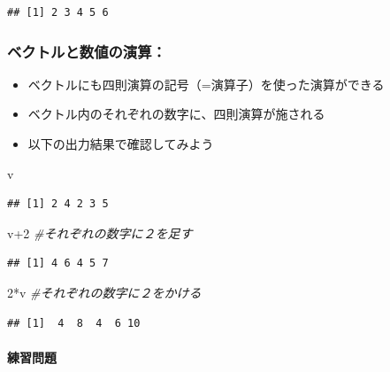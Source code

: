 \documentclass[
]{book}
\newenvironment{Shaded}{\begin{snugshade}}{\end{snugshade}}
\newcommand{\CommentTok}[1]{\textcolor[rgb]{0.56,0.35,0.01}{\textit{#1}}}
\newcommand{\DecValTok}[1]{\textcolor[rgb]{0.00,0.00,0.81}{#1}}
\newcommand{\NormalTok}[1]{#1}
\newcommand{\SpecialCharTok}[1]{\textcolor[rgb]{0.00,0.00,0.00}{#1}}
\providecommand{\tightlist}{%
  \setlength{\itemsep}{0pt}\setlength{\parskip}{0pt}}
\begin{document}
\begin{verbatim}
## [1] 2 3 4 5 6
\end{verbatim}

\hypertarget{ux30d9ux30afux30c8ux30ebux3068ux6570ux5024ux306eux6f14ux7b97}{%
\subsubsection*{ベクトルと数値の演算：}\label{ux30d9ux30afux30c8ux30ebux3068ux6570ux5024ux306eux6f14ux7b97}}

\begin{itemize}
\tightlist
\item
  ベクトルにも四則演算の記号（=演算子）を使った演算ができる
\item
  ベクトル内のそれぞれの数字に、四則演算が施される
\item
  以下の出力結果で確認してみよう
\end{itemize}

\begin{Shaded}
\begin{Highlighting}[]
\NormalTok{v}
\end{Highlighting}
\end{Shaded}

\begin{verbatim}
## [1] 2 4 2 3 5
\end{verbatim}

\begin{Shaded}
\begin{Highlighting}[]
\NormalTok{v}\SpecialCharTok{+}\DecValTok{2}  \CommentTok{\#それぞれの数字に２を足す }
\end{Highlighting}
\end{Shaded}

\begin{verbatim}
## [1] 4 6 4 5 7
\end{verbatim}

\begin{Shaded}
\begin{Highlighting}[]
\DecValTok{2}\SpecialCharTok{*}\NormalTok{v  }\CommentTok{\#それぞれの数字に２をかける  }
\end{Highlighting}
\end{Shaded}

\begin{verbatim}
## [1]  4  8  4  6 10
\end{verbatim}

\hypertarget{ux7df4ux7fd2ux554fux984c-2}{%
\paragraph*{練習問題}\label{ux7df4ux7fd2ux554fux984c-2}}
\end{document}
